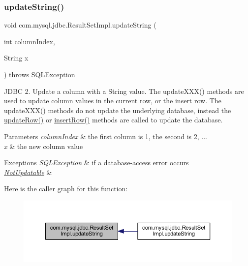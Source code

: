 \subsubsection{\texorpdfstring{update\+String()}{updateString()}\hspace{0.1cm}{\footnotesize\ttfamily [1/2]}}
{\footnotesize\ttfamily void com.\+mysql.\+jdbc.\+Result\+Set\+Impl.\+update\+String (\begin{DoxyParamCaption}\item[{int}]{column\+Index,  }\item[{String}]{x }\end{DoxyParamCaption}) throws S\+Q\+L\+Exception}

J\+D\+BC 2. Update a column with a String value. The update\+X\+X\+X() methods are used to update column values in the current row, or the insert row. The update\+X\+X\+X() methods do not update the underlying database, instead the \mbox{\hyperlink{classcom_1_1mysql_1_1jdbc_1_1_result_set_impl_a2842d32292d023aaeeafedeed3322981}{update\+Row()}} or \mbox{\hyperlink{classcom_1_1mysql_1_1jdbc_1_1_result_set_impl_a78e304e3279cbcf60392f18c1385e3bf}{insert\+Row()}} methods are called to update the database.


\begin{DoxyParams}{Parameters}
{\em column\+Index} & the first column is 1, the second is 2, ... \\
\hline
{\em x} & the new column value\\
\hline
\end{DoxyParams}

\begin{DoxyExceptions}{Exceptions}
{\em S\+Q\+L\+Exception} & if a database-\/access error occurs \\
\hline
{\em \mbox{\hyperlink{classcom_1_1mysql_1_1jdbc_1_1_not_updatable}{Not\+Updatable}}} & \\
\hline
\end{DoxyExceptions}
Here is the caller graph for this function\+:
\nopagebreak
\begin{figure}[H]
\begin{center}
\leavevmode
\includegraphics[width=350pt]{classcom_1_1mysql_1_1jdbc_1_1_result_set_impl_a2e10fbf310a4ce03868caa68bc786a34_icgraph}
\end{center}
\end{figure}
\mbox{\label{classcom_1_1mysql_1_1jdbc_1_1_result_set_impl_afe4296f714f0851ffe460354b4f4a5c0}} 

